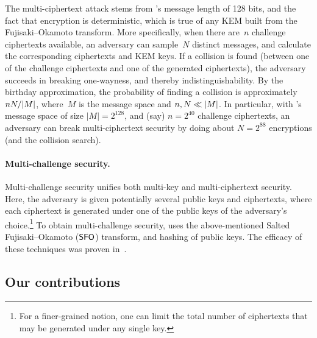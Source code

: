 The multi-ciphertext attack stems from \FrodoKEMLOne's message length of 128 bits, and the fact that encryption is deterministic, which is true of any KEM built from the Fujisaki--Okamoto transform.
More specifically, when there are~$n$ challenge ciphertexts available, an adversary can sample~$N$ distinct messages, and calculate the corresponding ciphertexts and KEM keys.
If a collision is found (between one of the challenge ciphertexts and one of the generated ciphertexts), the adversary succeeds in breaking one-wayness, and thereby indistinguishability.
By the birthday approximation, the probability of finding a collision is approximately $nN/\lvert M\rvert$, where~$M$ is the message space and $n,N \ll \lvert M\rvert$.
In particular, with \FrodoKEMLOne's message space of size $|M| = 2^{128}$, and (say) $n=2^{40}$ challenge ciphertexts, an adversary can break multi-ciphertext security by doing about $N = 2^{88}$ encryptions (and the collision search).

\paragraph{Multi-challenge security.}

Multi-challenge security unifies both multi-key and multi-ciphertext security.
Here, the adversary is given potentially several public keys and ciphertexts, where each ciphertext is generated under one of the public keys of the adversary's choice.\footnote{For a finer-grained notion, one can limit the total number of ciphertexts that may be generated under any single key.}
To obtain multi-challenge security, \FrodoKEM uses the above-mentioned Salted Fujisaki--Okamoto ($\mathsf{SFO}$) transform, and hashing of public keys.
The efficacy of these techniques was proven in~\cite{GlabushThesis}.


\subsection{Our contributions}

